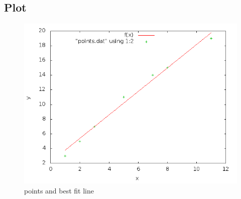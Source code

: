 \documentclass[a4paper,10pt]{article}
\begin{document}

	\subsection{Plot}
		\begin{figure}[!htb]
			\centering
			\includegraphics[scale=.5]{plot.png}
			\caption{points and best fit line}
			\label{fig:algcomp}
		\end{figure}
\end{document}
